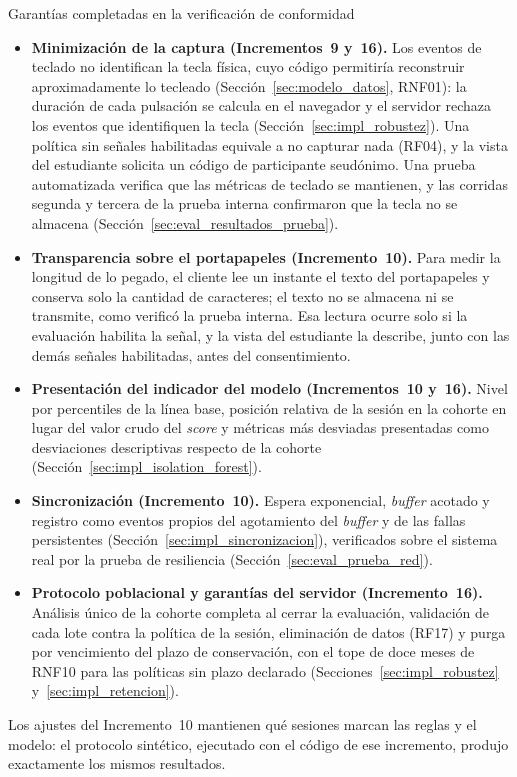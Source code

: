 \begin{keyfinding}{Garantías completadas en la verificación de conformidad}
\begin{itemize}
    \item \textbf{Minimización de la captura (Incrementos~9 y~16).} Los eventos de teclado no identifican la tecla física, cuyo código permitiría reconstruir aproximadamente lo tecleado (Sección~\ref{sec:modelo_datos}, RNF01): la duración de cada pulsación se calcula en el navegador y el servidor rechaza los eventos que identifiquen la tecla (Sección~\ref{sec:impl_robustez}). Una política sin señales habilitadas equivale a no capturar nada (RF04), y la vista del estudiante solicita un código de participante seudónimo. Una prueba automatizada verifica que las métricas de teclado se mantienen, y las corridas segunda y tercera de la prueba interna confirmaron que la tecla no se almacena (Sección~\ref{sec:eval_resultados_prueba}).
    \item \textbf{Transparencia sobre el portapapeles (Incremento~10).} Para medir la longitud de lo pegado, el cliente lee un instante el texto del portapapeles y conserva solo la cantidad de caracteres; el texto no se almacena ni se transmite, como verificó la prueba interna. Esa lectura ocurre solo si la evaluación habilita la señal, y la vista del estudiante la describe, junto con las demás señales habilitadas, antes del consentimiento.
    \item \textbf{Presentación del indicador del modelo (Incrementos~10 y~16).} Nivel por percentiles de la línea base, posición relativa de la sesión en la cohorte en lugar del valor crudo del \textit{score} y métricas más desviadas presentadas como desviaciones descriptivas respecto de la cohorte (Sección~\ref{sec:impl_isolation_forest}).
    \item \textbf{Sincronización (Incremento~10).} Espera exponencial, \textit{buffer} acotado y registro como eventos propios del agotamiento del \textit{buffer} y de las fallas persistentes (Sección~\ref{sec:impl_sincronizacion}), verificados sobre el sistema real por la prueba de resiliencia (Sección~\ref{sec:eval_prueba_red}).
    \item \textbf{Protocolo poblacional y garantías del servidor (Incremento~16).} Análisis único de la cohorte completa al cerrar la evaluación, validación de cada lote contra la política de la sesión, eliminación de datos (RF17) y purga por vencimiento del plazo de conservación, con el tope de doce meses de RNF10 para las políticas sin plazo declarado (Secciones~\ref{sec:impl_robustez} y~\ref{sec:impl_retencion}).
\end{itemize}
Los ajustes del Incremento~10 mantienen qué sesiones marcan las reglas y el modelo: el protocolo sintético, ejecutado con el código de ese incremento, produjo exactamente los mismos resultados.
\end{keyfinding}

